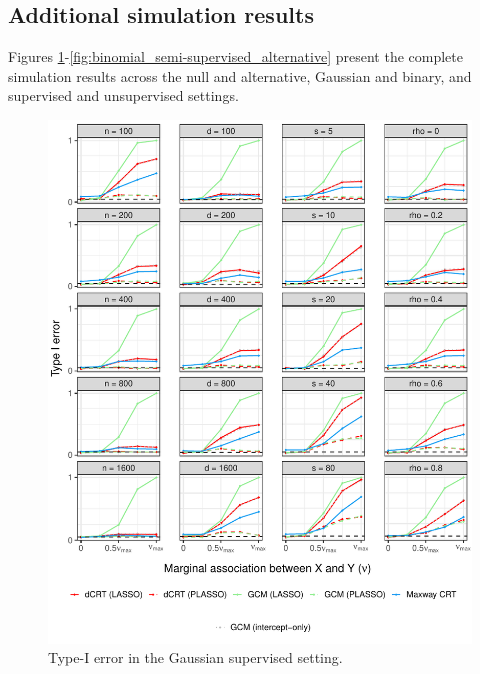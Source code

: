 \documentclass[aos]{imsart}
\theoremstyle{plain}
\theoremstyle{remark}
\begin{document}
\subsection{Additional simulation results} \label{sec:additional-simulation-results}

Figures \ref{fig:gaussian_supervised_null}-\ref{fig:binomial_semi-supervised_alternative} present the complete simulation results across the null and alternative, Gaussian and binary, and supervised and unsupervised settings.

\begin{figure}[!ht]
	\centering
	\includegraphics[width = \textwidth]{figures/gaussian_supervised_setting_null.pdf}
	\caption{Type-I error in the Gaussian supervised setting.}
	\label{fig:gaussian_supervised_null}
\end{figure}
\end{document}
